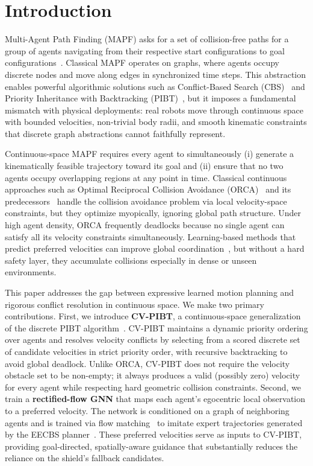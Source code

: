 \section{Introduction}
\label{sec:intro}

Multi-Agent Path Finding (MAPF) asks for a set of collision-free paths for a group of agents navigating from their respective start configurations to goal configurations~\cite{stern2019mapfsurvey}. Classical MAPF operates on graphs, where agents occupy discrete nodes and move along edges in synchronized time steps. This abstraction enables powerful algorithmic solutions such as Conflict-Based Search (CBS)~\cite{sharon2015cbs} and Priority Inheritance with Backtracking (PIBT)~\cite{okumura2022pibt}, but it imposes a fundamental mismatch with physical deployments: real robots move through continuous space with bounded velocities, non-trivial body radii, and smooth kinematic constraints that discrete graph abstractions cannot faithfully represent.

Continuous-space MAPF requires every agent to simultaneously (i) generate a kinematically feasible trajectory toward its goal and (ii) ensure that no two agents occupy overlapping regions at any point in time. Classical continuous approaches such as Optimal Reciprocal Collision Avoidance (ORCA)~\cite{vandenberg2011orca} and its predecessors~\cite{vandenberg2008rvo} handle the collision avoidance problem via local velocity-space constraints, but they optimize myopically, ignoring global path structure. Under high agent density, ORCA frequently deadlocks because no single agent can satisfy all its velocity constraints simultaneously. Learning-based methods that predict preferred velocities can improve global coordination~\cite{sartoretti2019primal,ma2021dhc,wang2023scrimp}, but without a hard safety layer, they accumulate collisions especially in dense or unseen environments.

This paper addresses the gap between expressive learned motion planning and rigorous conflict resolution in continuous space. We make two primary contributions. First, we introduce \textbf{CV-PIBT}, a continuous-space generalization of the discrete PIBT algorithm~\cite{okumura2022pibt}. CV-PIBT maintains a dynamic priority ordering over agents and resolves velocity conflicts by selecting from a scored discrete set of candidate velocities in strict priority order, with recursive backtracking to avoid global deadlock. Unlike ORCA, CV-PIBT does not require the velocity obstacle set to be non-empty; it always produces a valid (possibly zero) velocity for every agent while respecting hard geometric collision constraints. Second, we train a \textbf{rectified-flow GNN} that maps each agent's egocentric local observation to a preferred velocity. The network is conditioned on a graph of neighboring agents and is trained via flow matching~\cite{liu2023rectifiedflow,lipman2023flowmatching} to imitate expert trajectories generated by the EECBS planner~\cite{li2021eecbs}. These preferred velocities serve as inputs to CV-PIBT, providing goal-directed, spatially-aware guidance that substantially reduces the reliance on the shield's fallback candidates.


